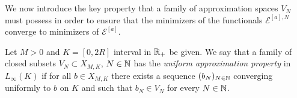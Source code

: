 




We now introduce the key property that a family of approximation spaces $V_N$ must possess in order to ensure that the minimizers of the functionals  $\mathcal E^{[a],N}$ converge to minimizers of $\mathcal E^{[a]}$.

\begin{definition}\label{VNdef}
Let $M > 0$ and $K=[0,2R]$ interval in $\mathbb{R}_+$  be given. We say that a family of closed subsets $V_N \subset X_{M,K}$, $N \in \mathbb{N}$ has the \emph{uniform approximation property} in $L_{\infty}(K)$ if for all $b\in X_{M,K}$ there exists a sequence $(b_N)_{N \in \mathbb{N}}$ converging uniformly to $b$ on $K$ and such that $b_N\in V_N$ for every $N \in \mathbb{N}$.
\end{definition}

